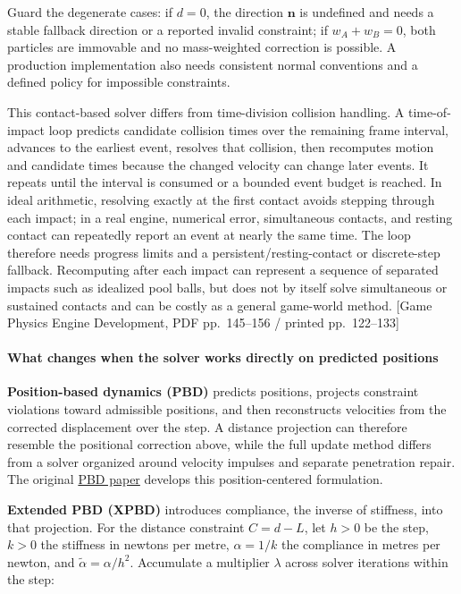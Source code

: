 Guard the degenerate cases: if \(d=0\), the direction \(\mathbf{n}\) is undefined and needs a stable fallback direction or a reported invalid constraint; if \(w_A+w_B=0\), both particles are immovable and no mass-weighted correction is possible. A production implementation also needs consistent normal conventions and a defined policy for impossible constraints.

This contact-based solver differs from time-division collision handling. A time-of-impact loop predicts candidate collision times over the remaining frame interval, advances to the earliest event, resolves that collision, then recomputes motion and candidate times because the changed velocity can change later events. It repeats until the interval is consumed or a bounded event budget is reached. In ideal arithmetic, resolving exactly at the first contact avoids stepping through each impact; in a real engine, numerical error, simultaneous contacts, and resting contact can repeatedly report an event at nearly the same time. The loop therefore needs progress limits and a persistent/resting-contact or discrete-step fallback. Recomputing after each impact can represent a sequence of separated impacts such as idealized pool balls, but does not by itself solve simultaneous or sustained contacts and can be costly as a general game-world method. {[}Game Physics Engine Development, PDF pp.~145--156 / printed pp.~122--133{]}

\paragraph{What changes when the solver works directly on predicted positions}\label{06-engine-ii-ch033-what-changes-when-the-solver-works-directly-on-predicted-positions}

\hypertarget{06-engine-ii-ch033-what-changes-when-the-solver-works-directly-on-predicted-positions}{}

\textbf{Position-based dynamics (PBD)} predicts positions, projects constraint violations toward admissible positions, and then reconstructs velocities from the corrected displacement over the step. A distance projection can therefore resemble the positional correction above, while the full update method differs from a solver organized around velocity impulses and separate penetration repair. The original \href{https://doi.org/10.2312/PE/vriphys/vriphys06/071-080}{PBD paper} develops this position-centered formulation.

\textbf{Extended PBD (XPBD)} introduces compliance, the inverse of stiffness, into that projection. For the distance constraint \(C=d-L\), let \(h>0\) be the step, \(k>0\) the stiffness in newtons per metre, \(\alpha=1/k\) the compliance in metres per newton, and \(\widetilde\alpha=\alpha/h^2\). Accumulate a multiplier \(\lambda\) across solver iterations within the step:

